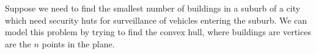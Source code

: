 
Suppose we need to find the smallest number of buildings in a suburb of a city which
need security huts for surveillance of vehicles entering the suburb. We can model this
problem by trying to find the convex hull, where buildings are vertices are the $n$ 
points in the plane.
